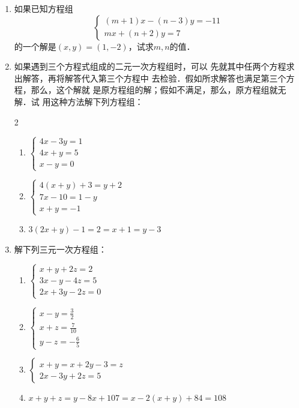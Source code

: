 \begin{enumerate}
\item 如果已知方程组
\[\begin{cases}
  (m+1)x-(n-3)y  =-11\\
  mx+(n+2)y=7 
    \end{cases}\]
的一个解是$(x,y)=(1,-2)$，试求$m,n$的值．

\item 如果遇到三个方程式组成的二元一次方程组时，可以
先就其中任两个方程求出解答，再将解答代入第三个方程中
去检验．假如所求解答也满足第三个方程，那么，这个解就
是原方程组的解；假如不满足，那么，原方程组就无解．试
用这种方法解下列方程组：
\begin{multicols}{2}
    \begin{enumerate}
\item $\begin{cases}
4x-3y=1\\4x+y=5\\x-y=0
\end{cases}$
\item $\begin{cases}
4(x+y)+3=y+2\\ 7x-10=1-y\\ x+y=-1
\end{cases}$
\item $3(2x+y)-1=2=x+1=y-3$
    \end{enumerate}
\end{multicols}

\item 解下列三元一次方程组：
    \begin{enumerate}
\item $\begin{cases}
    x+y+2z=2\\ 3x-y-4z=5\\ 2x+3y-2z=0
    \end{cases}$
\item $\begin{cases}
    x-y=\frac{3}{2}\\x+z=\frac{7}{10}\\y-z=-\frac{6}{5}
    \end{cases}$
    \item $\begin{cases}
    x+y=x+2y-3=z\\ 2x-3y+2z=5
    \end{cases}$
    \item $
    x+y+z=y-8x+107=x-2(x+y)+84=108$
    \end{enumerate}


\end{enumerate}
